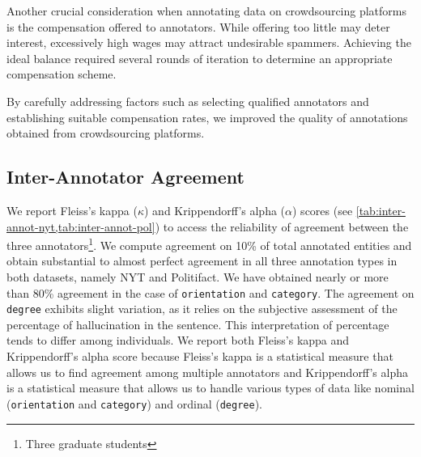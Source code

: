Another crucial consideration when annotating data on crowdsourcing platforms is the compensation offered to annotators. While offering too little may deter interest, excessively high wages may attract undesirable spammers. Achieving the ideal balance required several rounds of iteration to determine an appropriate compensation scheme.

By carefully addressing factors such as selecting qualified annotators and establishing suitable compensation rates, we improved the quality of annotations obtained from crowdsourcing platforms.



\subsection{Inter-Annotator Agreement}
We report Fleiss's kappa ($\kappa$) \cite{Wikipedia-Kappa} and Krippendorff's alpha ($\alpha$) \cite{Wikipedia-Alpha} scores (see \cref{tab:inter-annot-nyt,tab:inter-annot-pol}) to access the reliability of agreement between the three annotators\footnote{Three graduate students}. We compute agreement on 10\% of total annotated entities and obtain  substantial to almost perfect agreement in all three annotation types in both datasets, namely NYT and Politifact. We have obtained nearly or more than 80\% agreement in the case of \texttt{orientation} and \texttt{category}. The agreement on \texttt{degree} exhibits slight variation, as it relies on the subjective assessment of the percentage of hallucination in the sentence. This interpretation of percentage tends to differ among individuals. We report both Fleiss's kappa and Krippendorff's alpha score because Fleiss's kappa is a statistical measure that allows us to find agreement among multiple annotators and Krippendorff's alpha is a statistical measure that allows us to handle various types of data like nominal (\texttt{orientation} and \texttt{category}) and ordinal (\texttt{degree}). \\

